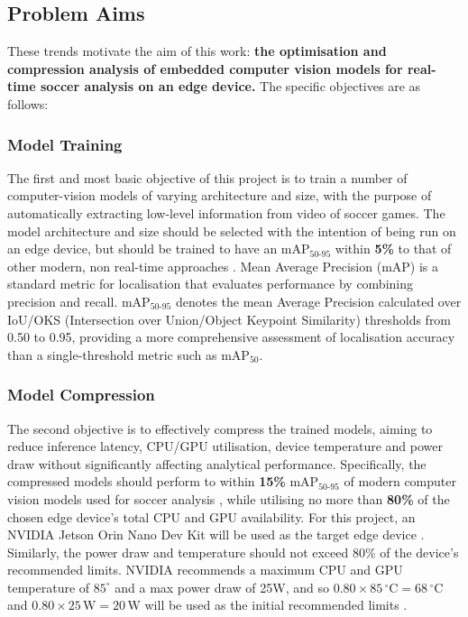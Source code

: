 \subsection{Problem Aims}

These trends motivate the aim of this work: \textbf{the optimisation and compression analysis of embedded computer vision models for real-time soccer analysis on an edge device.} The specific objectives are as follows: 

\subsubsection{Model Training}
\label{sec:problem1}
 The first and most basic objective of this project is to train a number of computer-vision models of varying architecture and size, with the purpose of automatically extracting low-level information from video of soccer games. The model architecture and size should be selected with the intention of being run on an edge device, but should be trained to have an $\text{mAP}_{50\text{-}95}$ within \textbf{5\%} to that of other modern, non real-time approaches \cite{tracking, rustebakke2025extracting, footandball}. Mean Average Precision (mAP) is a standard metric for localisation that evaluates performance by combining precision and recall. $\text{mAP}_{50\text{-}95}$ denotes the mean Average Precision calculated over IoU/OKS (Intersection over Union/Object Keypoint Similarity) thresholds from 0.50 to 0.95, providing a more comprehensive assessment of localisation accuracy than a single-threshold metric such as $\text{mAP}_{50}$.




\subsubsection{Model Compression}
\label{sec:problem2} The second objective is to effectively compress the trained models, aiming to reduce inference latency, CPU/GPU utilisation, device temperature and power draw without significantly affecting analytical performance. Specifically, the compressed models should perform to within \textbf{15\%} $\text{mAP}_{50\text{-}95}$ of modern computer vision models used for soccer analysis \cite{tracking, rustebakke2025extracting, footandball}, while utilising no more than \textbf{80\%} of the chosen edge device's total CPU and GPU availability. For this project, an NVIDIA Jetson Orin Nano Dev Kit will be used as the target edge device \cite{JetsonOrinNano}. Similarly, the power draw and temperature should not exceed 80\% of the device's recommended limits. NVIDIA recommends a maximum CPU and GPU temperature of $85^\circ$ and a max power draw of 25W, and so $0.80 \times 85\,^\circ\mathrm{C} = 68\,^\circ\mathrm{C}$ and
$0.80 \times 25\,\mathrm{W} = 20\,\mathrm{W}$ will be used as the initial recommended limits \cite{JetsonOrinNano}. 

